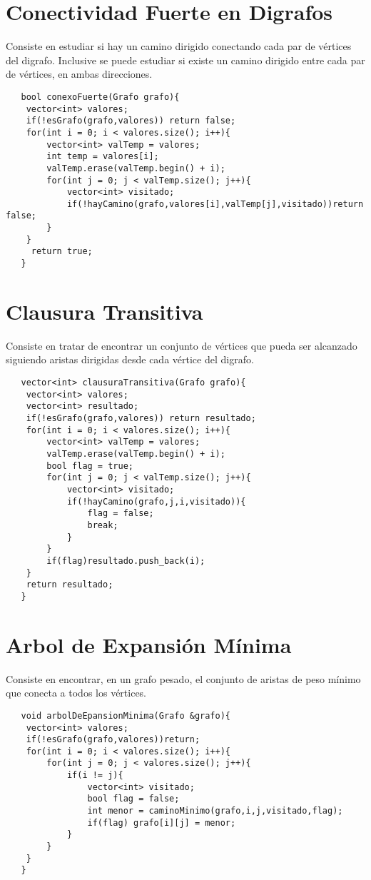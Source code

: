 \documentclass[a4paper,12pt]{article}
\begin{document}
  
  \section{Conectividad Fuerte en Digrafos}
  Consiste en estudiar si hay un camino dirigido conectando cada par de vértices
  del digrafo. Inclusive se puede estudiar si existe un camino dirigido entre
  cada par de vértices, en ambas direcciones.
  \begin{lstlisting}
   bool conexoFuerte(Grafo grafo){
    vector<int> valores;
    if(!esGrafo(grafo,valores)) return false;
    for(int i = 0; i < valores.size(); i++){
        vector<int> valTemp = valores;
        int temp = valores[i];
        valTemp.erase(valTemp.begin() + i);
        for(int j = 0; j < valTemp.size(); j++){
            vector<int> visitado;
            if(!hayCamino(grafo,valores[i],valTemp[j],visitado))return false;
        }
    }
     return true;
   }
  \end{lstlisting}
  
  \section{Clausura Transitiva}
  Consiste en tratar de encontrar un conjunto de vértices que pueda ser
  alcanzado siguiendo aristas dirigidas desde cada vértice del digrafo.
  \begin{lstlisting}
   vector<int> clausuraTransitiva(Grafo grafo){
    vector<int> valores;
    vector<int> resultado;
    if(!esGrafo(grafo,valores)) return resultado;
    for(int i = 0; i < valores.size(); i++){
        vector<int> valTemp = valores;
        valTemp.erase(valTemp.begin() + i);
        bool flag = true;
        for(int j = 0; j < valTemp.size(); j++){
            vector<int> visitado;
            if(!hayCamino(grafo,j,i,visitado)){
                flag = false;
                break;
            }
        }
        if(flag)resultado.push_back(i);
    }
    return resultado;
   }
  \end{lstlisting}
  
  \section{Arbol de Expansión Mínima}
  Consiste en encontrar, en un grafo pesado, el conjunto de aristas de peso mínimo
  que conecta a todos los vértices.
  \begin{lstlisting}
   void arbolDeEpansionMinima(Grafo &grafo){
    vector<int> valores;
    if(!esGrafo(grafo,valores))return;
    for(int i = 0; i < valores.size(); i++){
        for(int j = 0; j < valores.size(); j++){
            if(i != j){
                vector<int> visitado;
                bool flag = false;
                int menor = caminoMinimo(grafo,i,j,visitado,flag);
                if(flag) grafo[i][j] = menor;
            }
        }
    }
   }
  \end{lstlisting}
\end{document}
